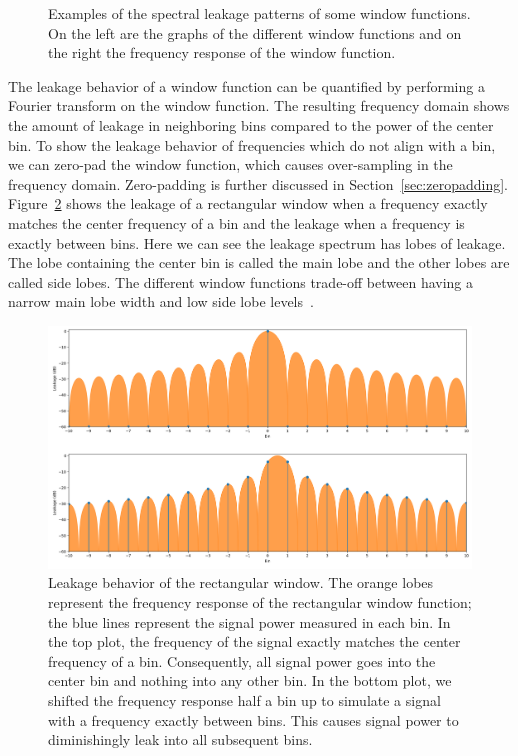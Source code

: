 \documentclass[a4paper,10pt,twocolumn]{article}
\begin{document}
\begin{figure}[b!]
    \caption{Examples of the spectral leakage patterns of some window functions. On the left are the graphs of the different window functions and on the right the frequency response of the window function.}
    \label{fig:windowfunceffect}
\end{figure}

The leakage behavior of a window function can be quantified by performing a Fourier transform on the window function. The resulting frequency domain shows the amount of leakage in neighboring bins compared to the power of the center bin. To show the leakage behavior of frequencies which do not align with a bin, we can zero-pad the window function, which causes over-sampling in the frequency domain. Zero-padding is further discussed in Section~\ref{sec:zeropadding}. Figure~\ref{fig:winleak} shows the leakage of a rectangular window when a frequency exactly matches the center frequency of a bin and the leakage when a frequency is exactly between bins. Here we can see the leakage spectrum has lobes of leakage. The lobe containing the center bin is called the main lobe and the other lobes are called side lobes. The different window functions trade-off between having a narrow main lobe width and low side lobe levels~\cite{windowfunc}.
\begin{figure}[b]
    \centering
    \includegraphics[width=\linewidth]{fig/winleak.png}
    \caption{Leakage behavior of the rectangular window. The orange lobes represent the frequency response of the rectangular window function; the blue lines represent the signal power measured in each bin. In the top plot, the frequency of the signal exactly matches the center frequency of a bin. Consequently, all signal power goes into the center bin and nothing into any other bin. In the bottom plot, we shifted the frequency response half a bin up to simulate a signal with a frequency exactly between bins. This causes signal power to diminishingly leak into all subsequent bins.}
    \label{fig:winleak}
\end{figure}
\end{document}
